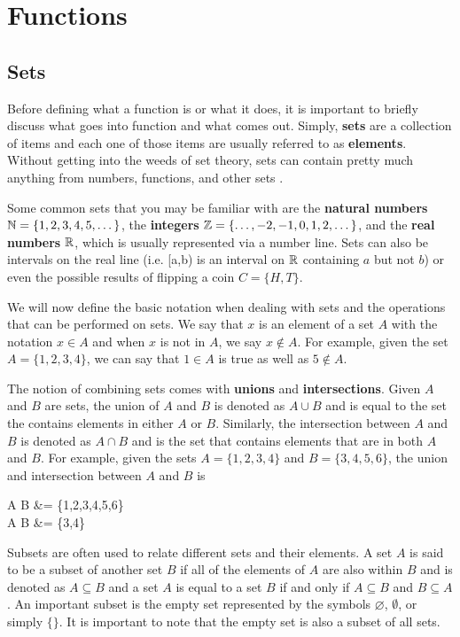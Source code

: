 \chapter{Functions}

\section{Sets}
Before defining what a function is or what it does, it is important to briefly discuss what goes into function and what comes out. Simply, \textbf{sets} are a collection of items and each one of those items are usually referred to as \textbf{elements}. Without getting into the weeds of set theory, sets can contain pretty much anything from numbers, functions, and other sets \cite{bookofproof}.

Some common sets that you may be familiar with are the \textbf{natural numbers} $\mathbb{N} = \{1,2,3,4,5,\dots\}$, the \textbf{integers} $\mathbb{Z} = \{\dots,-2,-1,0,1,2,\dots\}$, and the \textbf{real numbers} $\mathbb{R}$, which is usually represented via a number line. Sets can also be intervals on the real line (i.e. [a,b) is an interval on $\mathbb{R}$ containing $a$ but not $b$) or even the possible results of flipping a coin $C = \{H,T\}$.

\medskip

We will now define the basic notation when dealing with sets and the operations that can be performed on sets. We say that $x$ is an element of a set $A$ with the notation $x \in A$ and when $x$ is not in $A$, we say $x \not\in A$. For example, given the set $A = \{1,2,3,4\}$, we can say that $1 \in A$ is true as well as $5 \not\in A$.

The notion of combining sets comes with \textbf{unions} and \textbf{intersections}. Given $A$ and $B$ are sets, the union of $A$ and $B$ is denoted as $A \cup B$ and is equal to the set the contains elements in either $A$ or $B$. Similarly, the intersection between $A$ and $B$ is denoted as $A \cap B$ and is the set that contains elements that are in both $A$ and $B$. For example, given the sets $A = \{1,2,3,4\}$ and $B = \{3,4,5,6\}$, the union and intersection between $A$ and $B$ is

\begin{aequation}
    A \cup B &= \{1,2,3,4,5,6\} \\
    A \cap B &= \{3,4\}
\end{aequation}

Subsets are often used to relate different sets and their elements. A set $A$ is said to be a subset of another set $B$ if all of the elements of $A$ are also within $B$ and is denoted as $A \subseteq B$ and a set $A$ is equal to a set $B$ if and only if $A \subseteq B$ and $B \subseteq A$. An important subset is the empty set represented by the symbols $\varnothing$, $\emptyset$, or simply $\{\}$. It is important to note that the empty set is also a subset of all sets.

